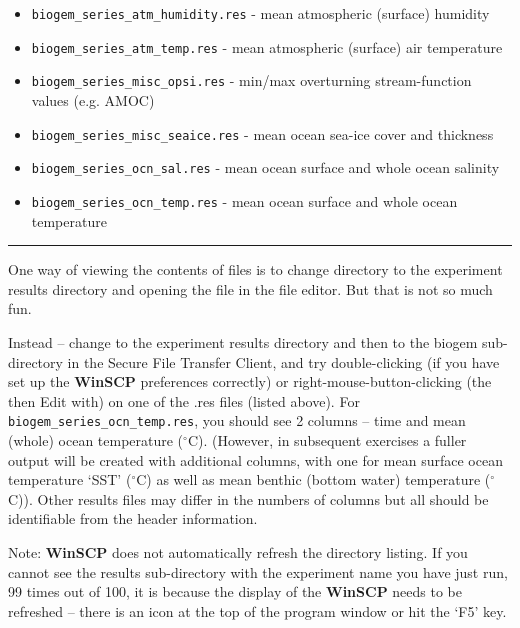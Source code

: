 \documentclass[11pt,fleqn]{book} %
\begin{document}
\begin{itemize}[noitemsep]
\setlength{\itemindent}{.2in}
\item \texttt{biogem\_series\_atm\_humidity.res}  - mean atmospheric (surface) humidity
\item \texttt{biogem\_series\_atm\_temp.res}      - mean atmospheric (surface) air temperature
\item \texttt{biogem\_series\_misc\_opsi.res}     - min/max overturning stream-function values (e.g. AMOC)
\item \texttt{biogem\_series\_misc\_seaice.res}   - mean ocean sea-ice cover and thickness
\item \texttt{biogem\_series\_ocn\_sal.res}       - mean ocean surface and whole ocean salinity
\item \texttt{biogem\_series\_ocn\_temp.res}      - mean ocean surface and whole ocean temperature
\end{itemize}

\vspace{1mm}
\noindent\rule{4cm}{0.1mm}
\vspace{2mm}

\noindent One way of viewing the contents of files is to change directory to the experiment results directory and opening the file in the file editor. But that is not so much fun.

Instead – change to the experiment results directory and then to the \textsf{\footnotesize biogem} sub-directory in the Secure File Transfer Client, and try double-clicking (if you have set up the \textbf{WinSCP} preferences correctly) or right-mouse-button-clicking (the then Edit with) on one of the .res files (listed above). For \texttt{biogem\_series\_ocn\_temp.res}, you should see 2 columns – time and mean (whole) ocean temperature ($^{\circ}$C). (However, in subsequent exercises a fuller output will be created with additional columns, with one for mean surface ocean temperature ‘SST’ ($^{\circ}$C) as well as mean benthic (bottom water) temperature ($^{\circ}$C)). Other results files may differ in the numbers of columns but all should be identifiable from the header information.

Note: \textbf{WinSCP} does not automatically refresh the directory listing. If you cannot see the results sub-directory with the experiment name you have just run, 99 times out of 100, it is because the display of the \textbf{WinSCP} needs to be refreshed -- there is an icon at the top of the program window or hit the ‘\textsf{F5}’ key.
\end{document}
